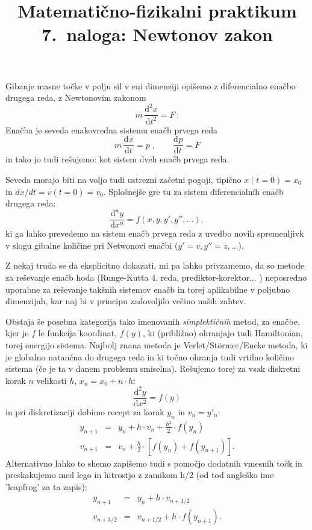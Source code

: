 \documentclass[slovene,11pt,a4paper]{article}
\title{
\sc\large Matematično-fizikalni praktikum \thisyear \\
\bigskip
\bf\Large 7.~naloga: Newtonov zakon
}
\author{}
\date{}
\newcommand{\ddd}{\mathrm{d}}
\newcommand{\Dd}[3][{}]{\frac{\ddd^{#1} #2}{\ddd #3^{#1}}}
\begin{document}
\maketitle
\vspace{-1cm}


Gibanje masne točke v polju sil v eni dimenziji opišemo
z diferencialno enačbo drugega reda, z Newtonovim zakonom
\begin{equation*}
m\, \Dd[2]{x}{t} = F \>.
\end{equation*}
Enačba je seveda enakovredna sistemu enačb prvega reda
\[
m\, \Dd{x}{t} = p \;, \qquad \Dd{p}{t} = F
\]
in tako jo tudi rešujemo: kot sistem dveh enačb prvega reda.

Seveda morajo biti na voljo tudi ustrezni začetni pogoji, tipično
$x(t=0)=x_0$ in $dx/dt=v(t=0)=v_0$. Splošnejše gre tu za sistem diferencialnih
enačb drugega reda:
\[
\Dd[n]{y}{x} = f(x,y,y',y'',...),
\]
ki ga lahko prevedemo na sistem enačb prvega reda z uvedbo novih spremenljivk v slogu
gibalne količine pri Netwonovi enačbi ($y'=v,y''=z,...$).

Z nekaj truda se da eksplicitno dokazati, mi pa lahko privzamemo, da so metode za
reševanje enačb hoda (Runge-Kutta 4. reda, prediktor-korektor... ) neposredno uporabne
za reševanje takšnih sistemov enačb in torej aplikabilne v poljubno dimenzijah, kar
naj bi v principu zadovoljilo večino naših zahtev.

Obstaja še posebna kategorija tako imenovanih \emph{simplektičnih} metod, za enačbe, kjer je $f$ le funkcija koordinat, $f(y)$, ki (približno) ohranjajo tudi Hamiltonian,
torej energijo sistema. Najbolj znana metoda je Verlet/St\"ormer/Encke metoda, ki je globalno
natančna do drugega reda in ki točno ohranja tudi vrtilno količino sistema (če je ta v danem problemu smiselna). Rešujemo torej za vsak diskretni korak $n$ velikosti $h$, $x_n=x_0+n \cdot h$:
\[
\Dd[2]{y}{x} = f(y)
\]
in pri diskretizaciji dobimo recept za korak $y_n$ in $v_n=y'_n$:
\begin{eqnarray*}
y_{n+1} &=& y_n + h \cdot v_n + \frac{h^2}{2} \cdot f(y_n) \\
v_{n+1} &=& v_n +  \frac{h}{2} \cdot \left[ f(y_n) + f(y_{n+1}) \right].
\end{eqnarray*}
Alternativno lahko to shemo zapišemo tudi s pomočjo dodatnih vmesnih točk in preskakujemo med lego in hitrostjo z zamikom h/2 (od tod angleško ime 'leapfrog' za ta zapis):
\begin{eqnarray*}
y_{n+1} &=& y_n + h \cdot v_{n+1/2} \\
v_{n+3/2} &=& v_{n+1/2} + h \cdot f(y_{n+1}).
\end{eqnarray*}
\end{document}
